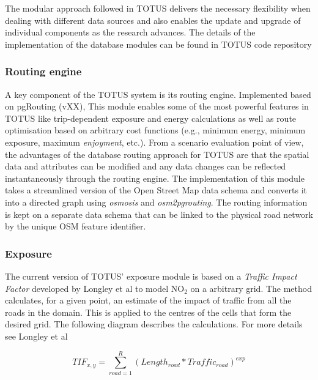 The modular approach followed in TOTUS delivers the necessary flexibility when dealing with different data sources and also enables the update and upgrade of individual components as the research advances. The details of the implementation of the database modules can be found in TOTUS code repository\cite{dummy_temp}

\subsubsection*{Routing engine}
A key component of the TOTUS system is its routing engine. Implemented based on pgRouting (vXX)\cite{dummy_temp}, This module enables some of the most powerful features in TOTUS like trip-dependent exposure and energy calculations as well as route optimisation based on arbitrary cost functions (e.g., minimum energy, minimum exposure, maximum \textit{enjoyment}, etc.). From a scenario evaluation point of view, the advantages of the database routing approach for TOTUS are that the spatial data and attributes can be modified and any data changes can be reflected instantaneously through the routing engine. The implementation of this module takes a streamlined version of the Open Street Map \cite{dummy_temp} data schema and converts it into a directed graph using \textit{osmosis}\cite{dummy_temp} and \textit{osm2pgrouting}\cite{dummy_temp}. The routing information is kept on a separate data schema that can be linked to the physical road network by the unique OSM feature identifier.

\subsubsection*{Exposure}
The current version of TOTUS' exposure module is based on a \textit{Traffic Impact Factor} developed by Longley et al\cite{dummy_temp} to model NO$_2$ on a arbitrary grid. The method calculates, for a given point, an estimate of the impact of traffic from all the roads in the domain. This is applied to the centres of the cells that form the desired grid. The following diagram describes the calculations. For more details see Longley et al\cite{dummy_temp}

\begin{equation}
TIF_{x,y} = \sum_{road=1}^{R}{(Length_{road}*Traffic_{road})^{exp}}
\end{equation}


